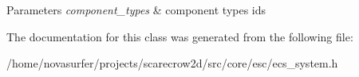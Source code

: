 \begin{DoxyParams}{Parameters}
{\em component\+\_\+types} & component types ids \\
\hline
\end{DoxyParams}


The documentation for this class was generated from the following file\+:\begin{DoxyCompactItemize}
\item 
/home/novasurfer/projects/scarecrow2d/src/core/esc/ecs\+\_\+system.\+h\end{DoxyCompactItemize}
